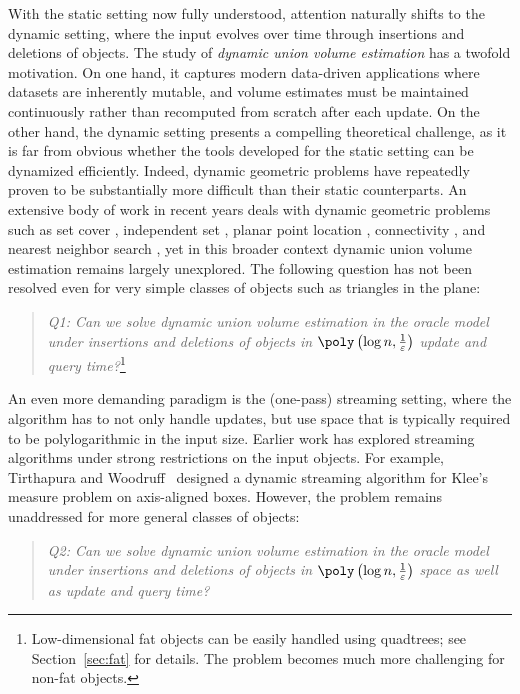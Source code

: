 \documentclass[a4paper, 11pt]{article}
\newcommand{\eps}{\varepsilon}
\begin{document}
With the static setting now fully understood, attention naturally shifts to the dynamic setting, where the input evolves over time through insertions and deletions of objects. The study of \emph{dynamic union volume estimation} has a twofold motivation. On one hand, it captures modern data-driven applications where datasets are inherently mutable, and volume estimates must be maintained continuously rather than recomputed from scratch after each update. On the other hand, the dynamic setting presents a compelling theoretical challenge, as it is far from obvious whether the tools developed for the static setting can be dynamized efficiently.
Indeed, dynamic geometric problems have repeatedly proven to be substantially more difficult than their static counterparts. An extensive body of work in recent years deals with dynamic geometric problems such as set cover \cite{AgarwalCSXX22, ChanHSX25}, independent set \cite{Henzinger0W20, BhoreNTW24, BhoreC25}, planar point location \cite{Nekrich21}, connectivity \cite{ChanPR11, ChanH24a}, and nearest neighbor search \cite{AgarwalAS18}, yet in this broader context dynamic union volume estimation remains largely unexplored. The following question has not been resolved even for very simple classes of objects such as triangles in the plane:

\begin{quote}
\begin{center}
   \emph{Q1: Can we solve dynamic union volume estimation in the oracle model under insertions and deletions of objects in $\poly \left( \log n, \frac{1}{\eps} \right)$ update and query time?}\footnote{Low-dimensional fat objects can be easily handled using quadtrees; see Section~\ref{sec:fat} for details. The problem becomes much more challenging for non-fat objects.}
\end{center}
\end{quote}

An even more demanding paradigm is the (one-pass) streaming setting, where the algorithm has to not only handle updates, but use space that is typically required to be polylogarithmic in the input size. Earlier work has explored streaming algorithms under strong restrictions on the input objects. For example, Tirthapura and Woodruff~\cite{TW12} designed a dynamic streaming algorithm for Klee’s measure problem on axis-aligned boxes. However, the problem remains unaddressed for more general classes of objects:

\begin{quote}
\begin{center}
   \emph{Q2: Can we solve dynamic union volume estimation in the oracle model under insertions and deletions of objects in $\poly \left( \log n, \frac{1}{\eps} \right)$ space as well as update and query time?}
\end{center}
\end{quote}
\end{document}
